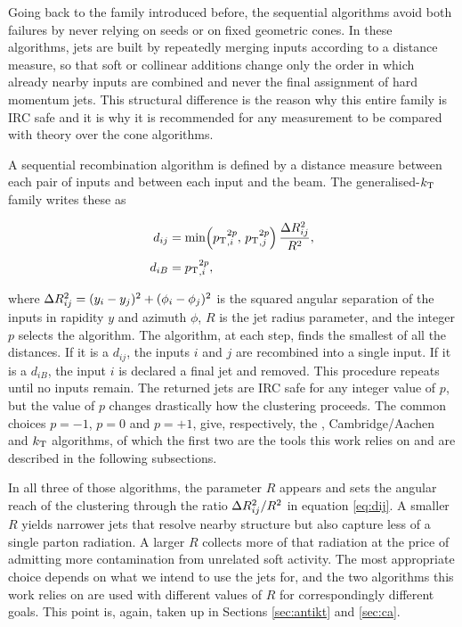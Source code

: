 Going back to the family introduced before, the sequential algorithms avoid both 
failures by never relying on seeds or on fixed geometric cones. In these algorithms,
jets are built by repeatedly merging inputs according to a distance measure, so that soft
or collinear additions change only the order in which already nearby inputs are combined
and never the final assignment of hard momentum jets. This structural difference is the 
reason why this entire family is IRC safe and it is why it is recommended
for any measurement to be compared with theory over the cone algorithms. 

A sequential recombination algorithm is defined by a distance measure between
each pair of inputs and between each input and the beam. The generalised-$k_{\mathrm{T}}$
family \cite{Salam_2010} writes these as

\begin{align}
  d_{ij} &= \min\!\left( p_{\mathrm{T}}{}_{,i}^{2p},\, p_{\mathrm{T}}{}_{,j}^{2p} \right)
           \frac{\Delta R_{ij}^2}{R^2}, \label{eq:dij}\\[4pt]
  d_{iB} &= p_{\mathrm{T}}{}_{,i}^{2p}, \label{eq:diB}
\end{align}

where $\Delta R_{ij}^2 = (y_i - y_j)^2 + (\phi_i - \phi_j)^2$ is the squared angular
separation of the inputs in rapidity $y$ and azimuth $\phi$, $R$ is the jet radius
parameter, and the integer $p$ selects the algorithm. The algorithm, at each step,
finds the smallest of all the distances. If it is a $d_{ij}$, the inputs $i$ and
$j$ are recombined into a single input. If it is a $d_{iB}$, the input $i$ is
declared a final jet and removed. This procedure repeats until no inputs remain.
The returned jets are IRC safe for any integer value of $p$, but the value
of $p$ changes drastically how the clustering proceeds. The common choices $p=-1$,
$p=0$ and $p=+1$, give, respectively, the \antikt{}, Cambridge/Aachen and $k_{\mathrm{T}}$
algorithms, of which the first two are the tools this work relies on and are
described in the following subsections.

In all three of those algorithms, the parameter $R$ appears and sets the angular
reach of the clustering through the ratio $\Delta R_{ij}^2/R^2$ in equation \eqref{eq:dij}.
A smaller $R$ yields narrower jets that resolve nearby structure but also capture less of
a single parton radiation. A larger $R$ collects more of that radiation at the price of
admitting more contamination from unrelated soft activity. The most appropriate
choice depends on what we intend to use the jets for, and the two algorithms this work
relies on are used with different values of $R$ for correspondingly different
goals. This point is, again, taken up in Sections \ref{sec:antikt}
and \ref{sec:ca}.

